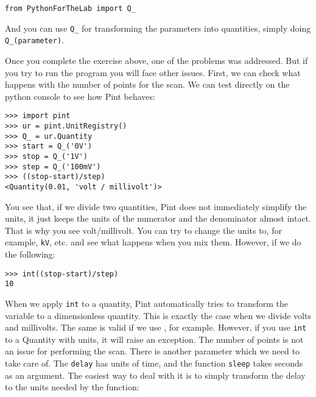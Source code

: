 \begin{verbatim}
from PythonForTheLab import Q_
\end{verbatim}

And you can use \texttt{Q_} for transforming the parameters into quantities, simply doing \texttt{Q_(parameter)}.




Once you complete the exercise above, one of the problems was addressed. But if you try to run the program you will face other issues. First, we can check what happens with the number of points for the scan. We can test directly on the python console to see how Pint behaves:

\begin{verbatim}
>>> import pint
>>> ur = pint.UnitRegistry()
>>> Q_ = ur.Quantity
>>> start = Q_('0V')
>>> stop = Q_('1V')
>>> step = Q_('100mV')
>>> ((stop-start)/step)
<Quantity(0.01, 'volt / millivolt')>
\end{verbatim}

You see that, if we divide two quantities, Pint does not immediately simplify the units, it just keeps the units of the numerator and the denominator almost intact. That is why you see volt/millivolt. You can try to change the units to, for example, \texttt{kV}, etc. and see what happens when you mix them. However, if we do the following:

\begin{verbatim}
>>> int((stop-start)/step)
10
\end{verbatim}

When we apply \texttt{int} to a quantity, Pint automatically tries to transform the variable to a dimensionless quantity. This is exactly the case when we divide volts and millivolts. The same is valid if we use , for example. However, if you use \texttt{int} to a Quantity with units, it will raise an exception. The number of points is not an issue for performing the scan. There is another parameter which we need to take care of. The \texttt{delay} has units of time, and the function \texttt{sleep} takes seconds as an argument. The easiest way to deal with it is to simply transform the delay to the units needed by the function:

